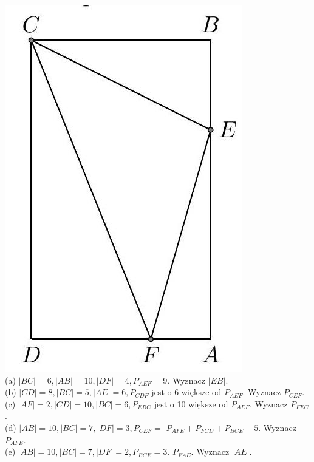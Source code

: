 \documentclass[10pt]{article}
\begin{document}
\includegraphics[max width=\textwidth, center]{2024_11_21_71f62bd117d375398909g-039}\\
(a) \(|B C|=6,|A B|=10,|D F|=4, P_{A E F}=9\). Wyznacz \(|E B|\).\\
(b) \(|C D|=8,|B C|=5,|A E|=6, P_{C D F}\) jest o 6 większe od \(P_{A E F}\). Wyznacz \(P_{C E F}\).\\
(c) \(|A F|=2,|C D|=10,|B C|=6, P_{E B C}\) jest o 10 większe od \(P_{A E F}\). Wyznacz \(P_{F E C}\).\\
(d) \(|A B|=10,|B C|=7,|D F|=3, P_{C E F}=\) \(P_{A F E}+P_{F C D}+P_{B C E}-5\). Wyznacz \(P_{A F E}\).\\
(e) \(|A B|=10,|B C|=7,|D F|=2, P_{B C E}=3\). \(P_{F A E}\). Wyznacz \(|A E|\).\\
\end{document}
